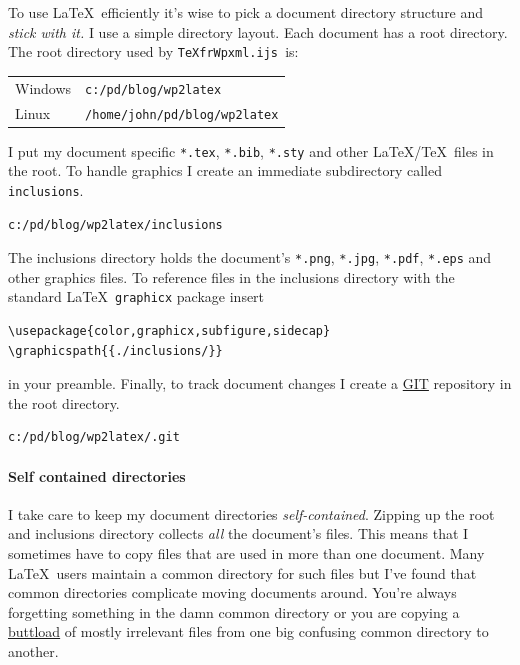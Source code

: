 To use \LaTeX\ efficiently it's wise to pick a document directory
structure and \emph{stick with it.} I use a simple directory layout. Each
document has a root directory. The root directory used by
\texttt{TeXfrWpxml.ijs~}is:

\begin{center}
\begin{tabular}{lp{}} 
   Windows          & \texttt{c:/pd/blog/wp2latex}  \\ 
   Linux            & \texttt{/home/john/pd/blog/wp2latex}            \\ 
\end{tabular}
\end{center}

\noindent I put my document specific \texttt{*.tex}, \texttt{*.bib},
\texttt{*.sty} and other \LaTeX/\TeX\ files in the root. To handle graphics
I create an immediate subdirectory called \texttt{inclusions}.
\begin{verbatim}
c:/pd/blog/wp2latex/inclusions
\end{verbatim}
The inclusions directory holds the document's \texttt{*.png},
\texttt{*.jpg}, \texttt{*.pdf}, \texttt{*.eps} and other graphics files.
To reference files in the inclusions directory with the standard \LaTeX\
\texttt{graphicx} package insert
\begin{verbatim}
\usepackage{color,graphicx,subfigure,sidecap}
\graphicspath{{./inclusions/}}
\end{verbatim}
in your preamble. Finally, to track document changes I create a
\href{http://git-scm.com/}{GIT} repository in the root directory.
\begin{verbatim}
c:/pd/blog/wp2latex/.git
\end{verbatim}

\paragraph{Self contained directories}

I take care to keep my document directories \emph{self-contained}.
Zipping up the root and inclusions directory collects \emph{all} the
document's files. This means that I sometimes have to copy files that
are used in more than one document. Many \LaTeX\ users maintain a common
directory for such files but I've found that common directories
complicate moving documents around. You're always forgetting something
in the damn common directory or you are copying a
\href{http://www.urbandictionary.com/define.php?term=buttload}{buttload}
of mostly irrelevant files from one big confusing common directory to
another.


